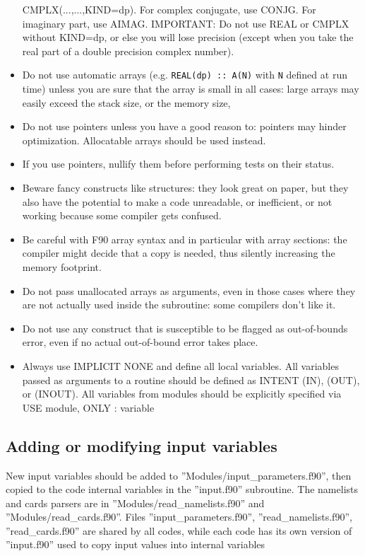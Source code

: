 \documentclass[12pt,a4paper]{article}
\begin{document}
\begin{itemize}
CMPLX(...,...,KIND=dp). For complex conjugate, use CONJG.  For imaginary part, 
use AIMAG.  IMPORTANT: Do not use REAL or CMPLX without KIND=dp, or else you 
will lose precision (except when you take the real part of a 
double precision complex number).
\item Do not use automatic arrays (e.g. \texttt{REAL(dp) :: A(N)} with
\texttt{N} defined at run time) unless you are sure that the array is 
small in all cases: large arrays may easily exceed the stack size,
or the memory size,
\item Do not use pointers unless you have a good reason to: 
pointers may hinder optimization. Allocatable arrays should be used instead.
\item If you use pointers, nullify them before performing tests on their
status.
\item Beware fancy constructs like structures: they look great on paper, 
but they also have the potential to make a code unreadable, or inefficient,
or not working because some compiler gets confused.
\item Be careful with F90 array syntax and in particular with
array sections: the compiler might decide that a copy is needed,
thus silently increasing the memory footprint.
\item Do not pass unallocated arrays as arguments, even in those cases where
they are not actually used inside the subroutine: some compilers don't
like it.
\item Do not use any construct that is susceptible to be flagged as 
out-of-bounds error, even if no actual out-of-bound error takes place.
\item Always use IMPLICIT NONE and define all local variables.
All variables passed as arguments to a routine should be defined as 
INTENT (IN), (OUT), or (INOUT). All variables from modules should be
explicitly specified via USE module, ONLY : variable
\end{itemize}

\subsection{Adding or modifying input variables}

New input variables should be added to 
''Modules/input\_parameters.f90'',
then copied to the code internal variables in the ''input.f90''
subroutine. The namelists and cards parsers are in
''Modules/read\_namelists.f90'' and ''Modules/read\_cards.f90''.
Files ''input\_parameters.f90'', ''read\_namelists.f90'',
''read\_cards.f90'' are shared by all codes, while each code
has its own version of ''input.f90''  used to copy input values
into internal variables
\end{document}
